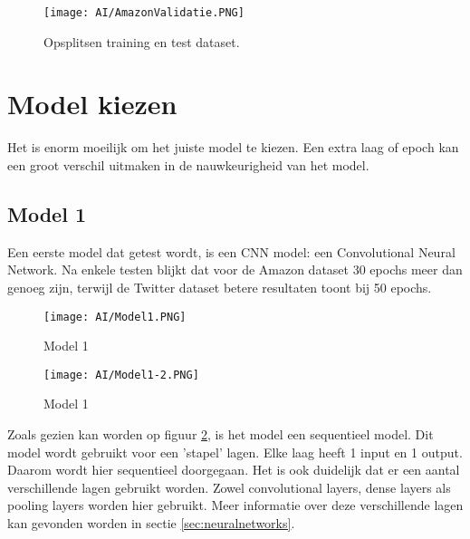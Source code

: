 \begin{figure}[!htbp]
    \texttt{[image: AI/AmazonValidatie.PNG]}
    \caption{\label{amazonopsplitsing}Opsplitsen training en test dataset.}
\end{figure}
\FloatBarrier

\section{Model kiezen}
\label{proofofconceptdatamodel}
Het is enorm moeilijk om het juiste model te kiezen. Een extra laag of epoch kan een groot verschil uitmaken in de nauwkeurigheid van het model. 

\subsection{Model 1}

Een eerste model dat getest wordt, is een \gls{CNN} model: een Convolutional Neural Network. Na enkele testen blijkt dat voor de Amazon dataset 30 epochs meer dan genoeg zijn, terwijl de Twitter dataset betere resultaten toont bij 50 epochs.
\begin{figure}[!htbp]
    \texttt{[image: AI/Model1.PNG]}
    \caption{\label{model1}Model 1}
\end{figure}
\FloatBarrier

\begin{figure}[!htbp]
    \texttt{[image: AI/Model1-2.PNG]}
    \caption{\label{model1.2}Model 1}
\end{figure}
\FloatBarrier

Zoals gezien kan worden op figuur \ref{model1}, is het model een sequentieel model. Dit model wordt gebruikt voor een 'stapel' lagen. Elke laag heeft 1 input en 1 output. Daarom wordt hier sequentieel doorgegaan. Het is ook duidelijk dat er een aantal verschillende lagen gebruikt worden. Zowel convolutional layers, dense layers als pooling layers worden hier gebruikt. Meer informatie over deze verschillende lagen kan gevonden worden in sectie \ref{sec:neuralnetworks}. 

